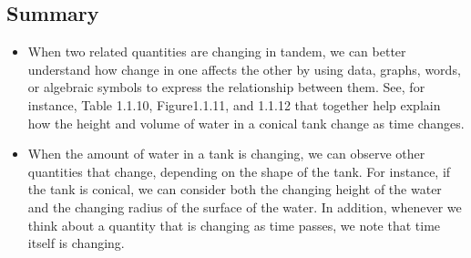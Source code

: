 \documentclass{ximera}
\begin{document}

\begin{tcolorbox}
\subsection{Summary}
\begin{itemize}[label=\textbullet]
\item When two related quantities are changing in tandem, we can better understand how change in one affects the other by using data, graphs, words, or algebraic symbols to express the relationship between them.  See, for instance, Table 1.1.10,  Figure1.1.11, and 1.1.12 that together help explain how the height and volume of water in a conical tank change as time changes.%
\item When the amount of water in a tank is changing, we can observe other quantities that change, depending on the shape of the tank.  For instance, if the tank is conical, we can consider both the changing height of the water and the changing radius of the surface of the water.  In addition, whenever we think about a quantity that is changing as time passes, we note that time itself is changing.%
\end{itemize}
\end{tcolorbox}
\end{document}
